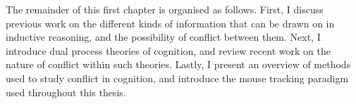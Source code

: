 The remainder of this first chapter is organised as follows.
First, I discuss previous work on
the different kinds of information
that can be drawn on in inductive reasoning,
and the possibility of conflict between them.
Next, I introduce dual process theories of cognition,
and review recent work on the nature of conflict within such theories.
Lastly, I present an overview of methods used to study conflict in cognition,
and introduce the mouse tracking paradigm used throughout this thesis.

